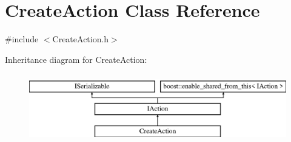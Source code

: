 \hypertarget{class_create_action}{}\section{Create\+Action Class Reference}
\label{class_create_action}


{\ttfamily \#include $<$Create\+Action.\+h$>$}

Inheritance diagram for Create\+Action\+:\begin{figure}[H]
\begin{center}
\leavevmode
\includegraphics[height=3.000000cm]{class_create_action}
\end{center}
\end{figure}
